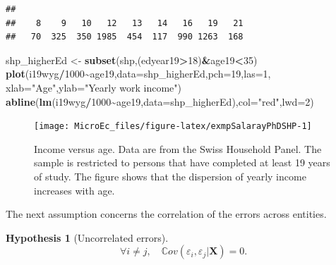 \documentclass[
  12pt,
]{book}
\newenvironment{Shaded}{\begin{snugshade}}{\end{snugshade}}
\newcommand{\AttributeTok}[1]{\textcolor[rgb]{0.13,0.29,0.53}{#1}}
\newcommand{\DecValTok}[1]{\textcolor[rgb]{0.00,0.00,0.81}{#1}}
\newcommand{\FunctionTok}[1]{\textcolor[rgb]{0.13,0.29,0.53}{\textbf{#1}}}
\newcommand{\NormalTok}[1]{#1}
\newcommand{\OtherTok}[1]{\textcolor[rgb]{0.56,0.35,0.01}{#1}}
\newcommand{\SpecialCharTok}[1]{\textcolor[rgb]{0.81,0.36,0.00}{\textbf{#1}}}
\newcommand{\StringTok}[1]{\textcolor[rgb]{0.31,0.60,0.02}{#1}}
\theoremstyle{definition}
\theoremstyle{definition}
\theoremstyle{definition}
\theoremstyle{definition}
\newtheorem{hypothesis}{Hypothesis}[chapter]
\theoremstyle{remark}
\begin{document}
\begin{Shaded}
\end{Shaded}

\begin{verbatim}
## 
##    8    9   10   12   13   14   16   19   21 
##   70  325  350 1985  454  117  990 1263  168
\end{verbatim}

\begin{Shaded}
\begin{Highlighting}[]
\NormalTok{shp\_higherEd }\OtherTok{\textless{}{-}} \FunctionTok{subset}\NormalTok{(shp,(edyear19}\SpecialCharTok{\textgreater{}}\DecValTok{18}\NormalTok{)}\SpecialCharTok{\&}\NormalTok{age19}\SpecialCharTok{\textless{}}\DecValTok{35}\NormalTok{)}
\FunctionTok{plot}\NormalTok{(i19wyg}\SpecialCharTok{/}\DecValTok{1000}\SpecialCharTok{\textasciitilde{}}\NormalTok{age19,}\AttributeTok{data=}\NormalTok{shp\_higherEd,}\AttributeTok{pch=}\DecValTok{19}\NormalTok{,}\AttributeTok{las=}\DecValTok{1}\NormalTok{,}
     \AttributeTok{xlab=}\StringTok{"Age"}\NormalTok{,}\AttributeTok{ylab=}\StringTok{"Yearly work income"}\NormalTok{)}
\FunctionTok{abline}\NormalTok{(}\FunctionTok{lm}\NormalTok{(i19wyg}\SpecialCharTok{/}\DecValTok{1000}\SpecialCharTok{\textasciitilde{}}\NormalTok{age19,}\AttributeTok{data=}\NormalTok{shp\_higherEd),}\AttributeTok{col=}\StringTok{"red"}\NormalTok{,}\AttributeTok{lwd=}\DecValTok{2}\NormalTok{)}
\end{Highlighting}
\end{Shaded}

\begin{figure}
\texttt{[image: MicroEc\_files/figure-latex/exmpSalarayPhDSHP-1]} \caption{Income versus age. Data are from the Swiss Household Panel. The sample is restricted to persons that have completed at least 19 years of study. The figure shows that the dispersion of yearly income increases with age.}\label{fig:exmpSalarayPhDSHP}
\end{figure}

The next assumption concerns the correlation of the errors across entities.

\begin{hypothesis}[Uncorrelated errors]
\protect\hypertarget{hyp:noncorrelResid}{}\label{hyp:noncorrelResid}\[
\forall i \ne j, \quad \mathbb{C}ov(\varepsilon_i,\varepsilon_j|\mathbf{X})=0.
\]
\end{hypothesis}
\end{document}
